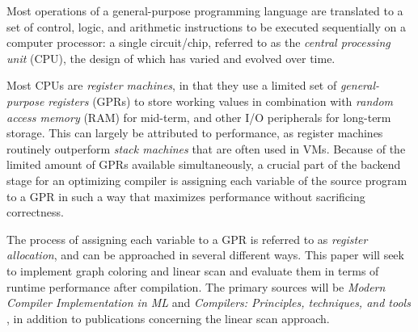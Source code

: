 \documentclass{article}
\begin{document}
Most operations of a general-purpose programming language are translated to a set of control, logic, and arithmetic instructions to be executed sequentially on a computer processor: a single circuit/chip, referred to as the \textit{central processing unit} (CPU), the design of which has varied and evolved over time.

Most CPUs are \textit{register machines}, in that they use a limited set of \textit{general-purpose registers} (GPRs) to store working values in combination with \textit{random access memory} (RAM) for mid-term, and other I/O peripherals for long-term storage. This can largely be attributed to performance, as register machines routinely outperform \textit{stack machines} \parencite{ShiYunhe2008VmsS} that are often used in VMs.
Because of the limited amount of GPRs available simultaneously, a crucial part of the backend stage for an optimizing compiler is assigning each variable  of the source program to a GPR in such a way that maximizes performance without sacrificing correctness.

The process of assigning each variable to a GPR is referred to as \textit{register allocation}, and can be approached in several different ways. This paper will seek to implement graph coloring and linear scan and evaluate them in terms of runtime performance after compilation. %
The primary sources will be \textit{Modern Compiler Implementation in ML} \parencite{tiger} and \textit{Compilers: Principles, techniques, and tools} \parencite{dragon}, in addition to publications concerning the linear scan approach.





\end{document}
